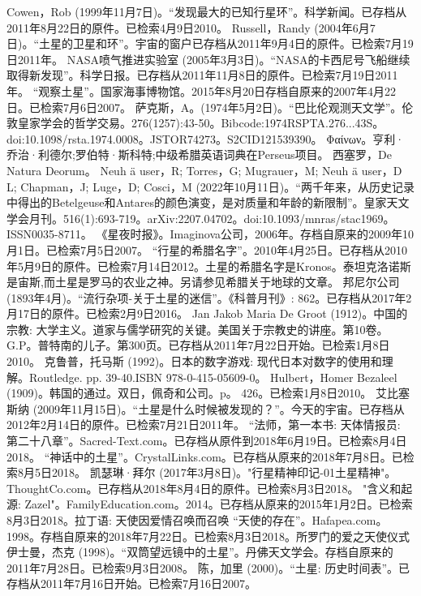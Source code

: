 \begin{enumerate}
 Cowen，Rob (1999年11月7日)。“发现最大的已知行星环”。科学新闻。已存档从2011年8月22日的原件。已检索4月9日2010。
 Russell，Randy (2004年6月7日)。“土星的卫星和环”。宇宙的窗户已存档从2011年9月4日的原件。已检索7月19日2011年。
 NASA喷气推进实验室 (2005年3月3日)。“NASA的卡西尼号飞船继续取得新发现”。科学日报。已存档从2011年11月8日的原件。已检索7月19日2011年。
 “观察土星”。国家海事博物馆。2015年8月20日存档自原来的2007年4月22日。已检索7月6日2007。
 萨克斯，A。(1974年5月2日)。“巴比伦观测天文学”。伦敦皇家学会的哲学交易。276(1257):43-50。Bibcode:1974RSPTA.276...43S。doi:10.1098/rsta.1974.0008。JSTOR74273。S2CID121539390。  
 Φαίνων。亨利·乔治·利德尔;罗伯特·斯科特;中级希腊英语词典在Perseus项目。
 西塞罗，De Natura Deorum。
 Neuh ä user，R; Torres，G; Mugrauer，M; Neuh ä user，D L; Chapman，J; Luge，D; Cosci，M (2022年10月11日)。“两千年来，从历史记录中得出的Betelgeuse和Antares的颜色演变，是对质量和年龄的新限制”。皇家天文学会月刊。516(1):693-719。arXiv:2207.04702。doi:10.1093/mnras/stac1969。ISSN0035-8711。 
 《星夜时报》。Imaginova公司，2006年。存档自原来的2009年10月1日。已检索7月5日2007。
 “行星的希腊名字”。2010年4月25日。已存档从2010年5月9日的原件。已检索7月14日2012。土星的希腊名字是Kronos。泰坦克洛诺斯是宙斯,而土星是罗马的农业之神。另请参见希腊关于地球的文章。
 邦尼尔公司 (1893年4月)。“流行杂项-关于土星的迷信”。《科普月刊》: 862。已存档从2017年2月17日的原件。已检索2月9日2016。
 Jan Jakob Maria De Groot (1912)。中国的宗教: 大学主义。道家与儒学研究的关键。美国关于宗教史的讲座。第10卷。G.P。普特南的儿子。第300页。已存档从2011年7月22日开始。已检索1月8日2010。
 克鲁普，托马斯 (1992)。日本的数字游戏: 现代日本对数字的使用和理解。Routledge. pp. 39-40.ISBN 978-0-415-05609-0。
 Hulbert，Homer Bezaleel (1909)。韩国的通过。双日，佩奇和公司。p。 426。已检索1月8日2010。
 艾比塞斯纳 (2009年11月15日)。“土星是什么时候被发现的？”。今天的宇宙。已存档从2012年2月14日的原件。已检索7月21日2011年。
 “法师，第一本书: 天体情报员: 第二十八章”。Sacred-Text.com。已存档从原件到2018年6月19日。已检索8月4日2018。
 “神话中的土星”。CrystalLinks.com。已存档从原来的2018年7月8日。已检索8月5日2018。
 凯瑟琳·拜尔 (2017年3月8日)。"行星精神印记-01土星精神"。ThoughtCo.com。已存档从2018年8月4日的原件。已检索8月3日2018。
 "含义和起源: Zazel"。FamilyEducation.com。2014。已存档从原来的2015年1月2日。已检索8月3日2018。拉丁语: 天使因爱情召唤而召唤
 “天使的存在”。Hafapea.com。1998。存档自原来的2018年7月22日。已检索8月3日2018。所罗门的爱之天使仪式
 伊士曼，杰克 (1998)。“双筒望远镜中的土星”。丹佛天文学会。存档自原来的2011年7月28日。已检索9月3日2008。
 陈，加里 (2000)。“土星: 历史时间表”。已存档从2011年7月16日开始。已检索7月16日2007。

\end{enumerate}
